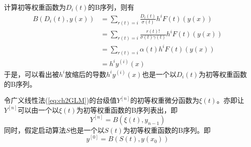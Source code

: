 计算初等权重函数为$D_i(t)$的B序列，则有
\begin{equation}
\begin{aligned}
B(D_i(t),y(x))&=\sum_{r(t)=i}\frac{D_i(t)}{\sigma(t)}h^iF(t)(y(x))\\
&=\sum_{r(t)=i}\frac{r(t)!}{\sigma(t)\gamma(t)}h^iF(t)(y(x))\\
&=\sum_{r(t)=i}\alpha(t)h^iF(t)(y(x))\\
&=h^iy^{(i)}(x)
\end{aligned}\label{eq:ch2ElemenWeightFunForDi}
\end{equation}
于是，可以看出被$h^i$放缩后的导数$h^iy^{(i)}(x)$也是一个以$D_i(t)$为初等权重函数的B序列。

令广义线性法(\ref{eq:ch2GLM})的台级值$Y^{[n]}$的初等权重微分函数为$\xi(t)$。亦即让$Y^{[n]}$可以由一个以$\xi(t)$为初等权重函数的B序列表出，即
\begin{equation}
Y^{[n]}=B(\xi(t),y_{n-1})\label{eq:ch2ElemeWightFunForStage}
\end{equation}
同时，假定启动算法$S$也是一个以$S(t)$为初等权重函数的B序列。即
\begin{equation}
y^{[0]}=B(S(t),y(x_0))
\end{equation}

